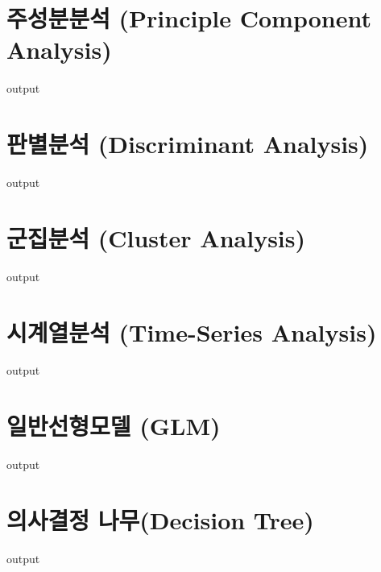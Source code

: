 \documentclass{report}
\begin{document}
\section{주성분분석 (Principle Component Analysis)}
\begin{Schunk}
\begin{Soutput}
output
\end{Soutput}
\end{Schunk}

\section{판별분석 (Discriminant Analysis) }
\begin{Schunk}
\begin{Soutput}
output
\end{Soutput}
\end{Schunk}

\section{군집분석 (Cluster Analysis) }
\begin{Schunk}
\begin{Soutput}
output
\end{Soutput}
\end{Schunk}

\section{시계열분석 (Time-Series Analysis) }
\begin{Schunk}
\begin{Soutput}
output
\end{Soutput}
\end{Schunk}

\section{일반선형모델 (GLM)}
\begin{Schunk}
\begin{Soutput}
output
\end{Soutput}
\end{Schunk}

\section{의사결정 나무(Decision Tree)}
\begin{Schunk}
\begin{Soutput}
output
\end{Soutput}
\end{Schunk}
\end{document}
